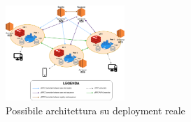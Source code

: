 \documentclass[conference]{IEEEtran}
\begin{document}
\begin{figure}[htbp]
\centerline{\includegraphics[width=0.4\textwidth]{figs/architecture-real.png}}
\caption{Possibile architettura su deployment reale}
\label{fig:architecture-real}
\end{figure}
\end{document}
